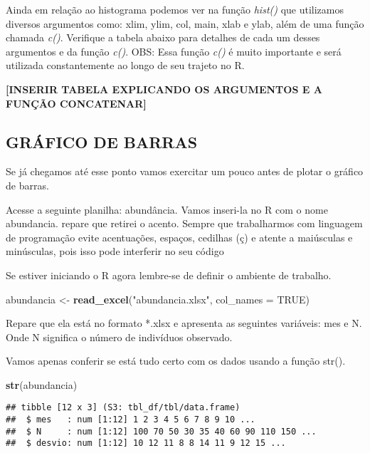\documentclass[]{book}
\newenvironment{Shaded}{\begin{snugshade}}{\end{snugshade}}
\newcommand{\DataTypeTok}[1]{\textcolor[rgb]{0.13,0.29,0.53}{#1}}
\newcommand{\KeywordTok}[1]{\textcolor[rgb]{0.13,0.29,0.53}{\textbf{#1}}}
\newcommand{\NormalTok}[1]{#1}
\newcommand{\OtherTok}[1]{\textcolor[rgb]{0.56,0.35,0.01}{#1}}
\newcommand{\StringTok}[1]{\textcolor[rgb]{0.31,0.60,0.02}{#1}}
\begin{document}
Ainda em relação ao histograma podemos ver na função \emph{hist()} que utilizamos diversos argumentos como: xlim, ylim, col, main, xlab e ylab, além de uma função chamada \emph{c()}. Verifique a tabela abaixo para detalhes de cada um desses argumentos e da função \emph{c()}. OBS: Essa função \emph{c()} é muito importante e será utilizada constantemente ao longo de seu trajeto no R.

\textbf{{[}INSERIR TABELA EXPLICANDO OS ARGUMENTOS E A FUNÇÃO CONCATENAR{]}}

\hypertarget{gruxe1fico-de-barras}{%
\subsection{GRÁFICO DE BARRAS}\label{gruxe1fico-de-barras}}

Se já chegamos até esse ponto vamos exercitar um pouco antes de plotar o gráfico de barras.

Acesse a seguinte planilha: abundância. Vamos inseri-la no R com o nome abundancia. repare que retirei o acento. Sempre que trabalharmos com linguagem de programação evite acentuações, espaços, cedilhas (ç) e atente a maiúsculas e minúsculas, pois isso pode interferir no seu código

Se estiver iniciando o R agora lembre-se de definir o ambiente de trabalho.

\begin{Shaded}
\begin{Highlighting}[]
\NormalTok{abundancia <-}\StringTok{ }\KeywordTok{read_excel}\NormalTok{(}\StringTok{"abundancia.xlsx"}\NormalTok{, }\DataTypeTok{col_names =} \OtherTok{TRUE}\NormalTok{)}
\end{Highlighting}
\end{Shaded}

Repare que ela está no formato *.xlsx e apresenta as seguintes variáveis: mes e N. Onde N significa o número de indivíduos observado.

Vamos apenas conferir se está tudo certo com os dados usando a função str().

\begin{Shaded}
\begin{Highlighting}[]
\KeywordTok{str}\NormalTok{(abundancia)}
\end{Highlighting}
\end{Shaded}

\begin{verbatim}
## tibble [12 x 3] (S3: tbl_df/tbl/data.frame)
##  $ mes   : num [1:12] 1 2 3 4 5 6 7 8 9 10 ...
##  $ N     : num [1:12] 100 70 50 30 35 40 60 90 110 150 ...
##  $ desvio: num [1:12] 10 12 11 8 8 14 11 9 12 15 ...
\end{verbatim}
\end{document}
